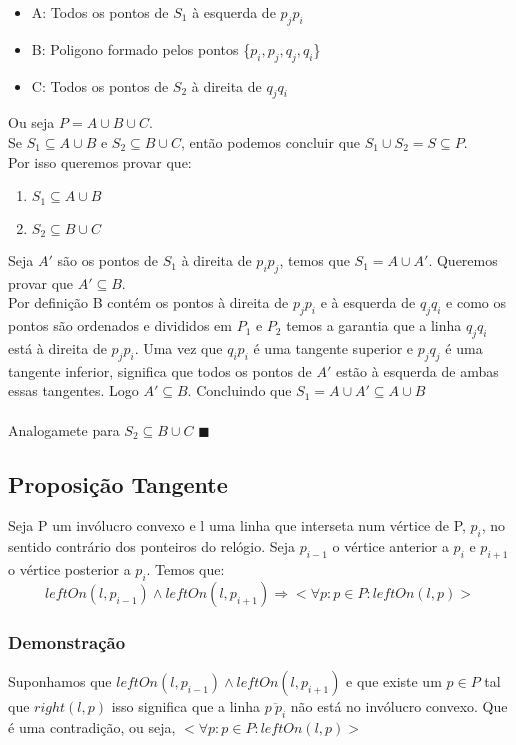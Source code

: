 \documentclass[11pt]{article}
\begin{document}
\begin{itemize}
    \item A: Todos os pontos de $S_1$ à esquerda de $p_jp_i$
    \item B: Poligono formado pelos pontos \{$p_i,p_j,q_j,q_i$\}
    \item C: Todos os pontos de $S_2$ à direita de $q_jq_i$
\end{itemize}
Ou seja $P = A \cup B \cup C$.\\
Se $S_1 \subseteq A \cup B$ e $S_2 \subseteq B \cup C$,
então podemos concluir que $S_1 \cup S_2 = S \subseteq P$.\\
Por isso queremos provar que:
\begin{enumerate}
    \item $S_1 \subseteq A \cup B$
    \item $S_2 \subseteq B \cup C$
\end{enumerate}
Seja $A'$ são os pontos de $S_1$ à direita de $p_ip_j$,
temos que $S_1 = A \cup A'$. 
\newline
Queremos provar que $A' \subseteq B$.\\
Por definição B contém os pontos à direita de $p_jp_i$ e à esquerda
de $q_jq_i$ e como os pontos são ordenados e divididos em $P_1$ e $P_2$
temos a garantia que a linha $q_jq_i$ está à direita de $p_jp_i$.
Uma vez que $q_ip_i$ é uma tangente superior e $p_jq_j$ é uma tangente
inferior, significa que todos os pontos de $A'$ estão à esquerda de
ambas essas tangentes. Logo $A' \subseteq B$.
Concluindo que $S_1 = A \cup A' \subseteq A \cup B$\\ \\
Analogamete para $S_2 \subseteq B \cup C$
\hfill $\blacksquare$

\subsection{Proposição Tangente}
Seja 
    P um invólucro convexo e 
    l uma linha que interseta num vértice de P, $p_i$,
no sentido contrário dos ponteiros do relógio.
Seja $p_{i-1}$ o vértice anterior a $p_i$ e $p_{i+1}$ o vértice posterior a $p_i$.
Temos que:
$$leftOn(l, p_{i-1}) \wedge leftOn(l, p_{i+1}) \Rightarrow
    <\forall p : p \in P : leftOn(l, p)>$$

\subsubsection{Demonstração}
Suponhamos que $leftOn(l, p_{i-1}) \wedge leftOn(l, p_{i+1})$ 
e que existe um $p \in P$ tal que $right(l, p)$
isso significa que a linha $\overline{p\ p_i}$ não está no invólucro convexo.
Que é uma contradição, ou seja, $<\forall p : p \in P : leftOn(l, p)>$
\end{document}
